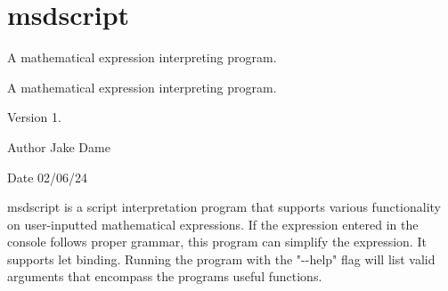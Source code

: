 \chapter{msdscript}
\hypertarget{index}{}\label{index}
A mathematical expression interpreting program.

A mathematical expression interpreting program.   

\begin{DoxyVersion}{Version}
1. 
\end{DoxyVersion}
\begin{DoxyAuthor}{Author}
Jake Dame 
\end{DoxyAuthor}
\begin{DoxyDate}{Date}
02/06/24 
\end{DoxyDate}
msdscript is a script interpretation program that supports various functionality on user-\/inputted mathematical expressions. If the expression entered in the console follows proper grammar, this program can simplify the expression. It supports let binding. Running the program with the "{}-\/-\/help"{} flag will list valid arguments that encompass the programs useful functions. 